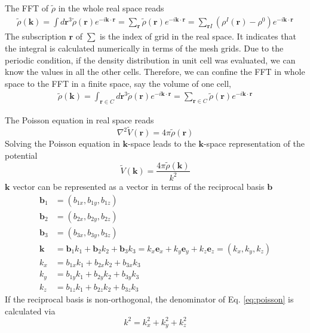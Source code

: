 \documentclass{article}
\begin{document}
The FFT of $\tilde{\rho}$ in the whole real space reads
\begin{align}
  \tilde{\rho}(\mathbf{k})
  =\int d\mathbf{r}^3 \tilde{\rho}(\mathbf{r}) e^{-i\mathbf{k}\cdot\mathbf{r}}
  =\sum_{\mathbf{r}} \tilde{\rho}(\mathbf{r})
  e^{-i\mathbf{k}\cdot \mathbf{r}}
  =\sum_{\mathbf{r} I}(\rho^I(\mathbf{r}) - \rho^0)
  e^{-i\mathbf{k}\cdot \mathbf{r}}
  \label{}
\end{align}
The subscription $\mathbf{r}$ of $\sum$ is the index of grid in the real
space.  It indicates that the integral is calculated numerically in
terms of the mesh grids.
Due to the periodic condition,
if the density distribution in unit cell was evaluated,
we can know the values in all the other cells.
Therefore, we can confine the FFT in whole space to the FFT in a finite space,
say the volume of one cell,
\begin{align}
  \tilde{\rho}(\mathbf{k})
  =\int_{\mathbf{r}\in C} d\mathbf{r}^3
  \tilde{\rho}(\mathbf{r}) e^{-i\mathbf{k}\cdot\mathbf{r}}
  =\sum_{\mathbf{r}\in C}
  \tilde{\rho}(\mathbf{r}) e^{-i\mathbf{k}\cdot \mathbf{r}}
  \label{}
\end{align}

The Poisson equation in real space reads
\begin{equation}
  \nabla^2 \tilde{V}(\mathbf{r}) = 4\pi \tilde{\rho}(\mathbf{r})
  \label{eq:poisson}
\end{equation}
Solving the Poisson equation in $\mathbf{k}$-space leads to
the $\mathbf{k}$-space representation of the potential
\begin{equation}
  \tilde{V}(\mathbf{k})=\frac{4\pi\tilde{\rho}(\mathbf{k})}{k^2}
  \label{}
\end{equation}
$\mathbf{k}$ vector can be represented as a vector in terms of the reciprocal
basis $\mathbf{b}$
\begin{align}
  \mathbf{b}_1 &= (b_{1x},b_{1y},b_{1z})\\
  \mathbf{b}_2 &= (b_{2x},b_{2y},b_{2z})\\
  \mathbf{b}_3 &= (b_{3x},b_{3y},b_{3z})\\
  \mathbf{k}
  &=\mathbf{b}_1 k_1 + \mathbf{b}_2 k_2 + \mathbf{b}_3 k_3
  = k_x \mathbf{e}_x + k_y \mathbf{e}_y + k_z \mathbf{e}_z
  = (k_x, k_y, k_z) \\
  k_x &= b_{1x}k_1 + b_{2x}k_2 + b_{3x}k_3 \\
  k_y &= b_{1y}k_1 + b_{2y}k_2 + b_{3y}k_3 \\
  k_z &= b_{1z}k_1 + b_{2z}k_2 + b_{3z}k_3
  \label{}
\end{align}
If the reciprocal basis is non-orthogonal,
the denominator of Eq. \eqref{eq:poisson} is calculated via
\begin{equation}
  k^2 = k_x^2 + k_y^2 + k_z^2
  \label{}
\end{equation}
\end{document}
